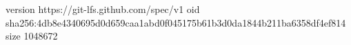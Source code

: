version https://git-lfs.github.com/spec/v1
oid sha256:4db8e4340695d0d659caa1abd0f045175b61b3d0da1844b211ba6358df4ef814
size 1048672

